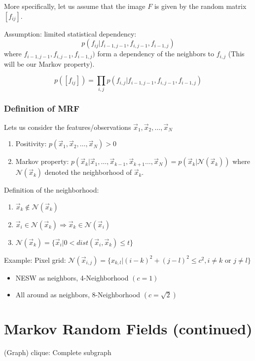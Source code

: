 \documentclass{scrartcl}
\begin{document}
More specifically, let us assume that the image \(F\) is given by the random matrix \([f_{ij}]\). %

Assumption: limited statistical dependency:
\[p(f_{ij}| f_{i-1, j-1}, f_{i, j-1}, f_{i-1,j})\]
where \(f_{i-1, j-1}, f_{i, j-1}, f_{i-1,j})\) form a dependency of the neighbors to \(f_{i,j}\) (This will be our Markov property).

\[p([f_{ij}]) = \prod_{i,j} p(f_{i,j} | f_{i-1, j-1}, f_{i, j-1}, f_{i-1,j})\]

\subsubsection{Definition of MRF}
Lets us consider the features/observations \(\vec{x}_1,\vec{x}_2, \dots, \vec{x}_N\)
\begin{enumerate}
    \item
        Positivity: \(p(\vec{x}_1,\vec{x}_2, \dots, \vec{x}_N) > 0\)
    \item
        Markov property: \(p(\vec{x}_k | \vec{x}_1, \dots, \vec{x}_{k-1},\vec{x}_{k+1} \dots, \vec{x}_N) = p(\vec{x}_k|\mathcal{N}(\vec{x}_k))\) where \(\mathcal{N}(\vec{x}_k)\) denoted the neighborhood of \(\vec{x}_k\).
\end{enumerate}
Definition of the neighborhood: 
\begin{enumerate}
    \item
        \(\vec{x}_k \notin \mathcal{N}(\vec{x}_k)\)
    \item
        \(\vec{x}_i \in \mathcal{N}(\vec{x}_k) \Rightarrow \vec{x}_k \in \mathcal{N}(\vec{x}_i)\)
    \item
        \(\mathcal{N}(\vec{x}_k) = \{\vec{x}_i | 0 < dist(\vec{x}_i, \vec{x}_k) \leq t\}\)
\end{enumerate}
Example: Pixel grid:
\(\mathcal{N}(\vec{x}_{i,j}) = \{x_{k,l} | (i - k)^2 + (j - l)^2 \leq c^2, i \neq k \text{ or } j \neq l \}\)
\begin{itemize}
    \item
        NESW as neighbors, 4-Neighborhood \((c=1)\)
    \item
        All around as neighbors, 8-Neighborhood \((c=\sqrt 2)\)
\end{itemize}

\section{Markov Random Fields (continued)}
(Graph) clique: Complete subgraph
\end{document}
